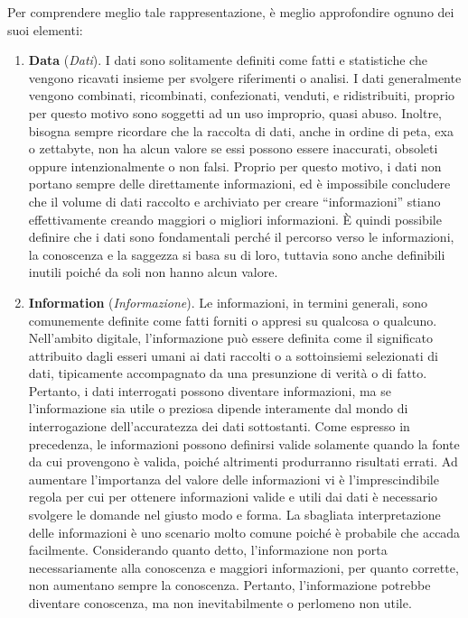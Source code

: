 Per comprendere meglio tale rappresentazione, è meglio approfondire ognuno dei suoi elementi:\cite{researchgate_revising_dikw_pyramid}
\begin{enumerate}
    \item \textbf{Data} (\textit{Dati}). I dati sono solitamente definiti come fatti e statistiche che vengono ricavati insieme per svolgere riferimenti o analisi. I dati generalmente vengono combinati, ricombinati, confezionati, venduti, e ridistribuiti, proprio per questo motivo sono soggetti ad un uso improprio, quasi abuso. Inoltre, bisogna sempre ricordare che la raccolta di dati, anche in ordine di peta, exa o zettabyte, non ha alcun valore se essi possono essere inaccurati, obsoleti oppure intenzionalmente o non falsi. Proprio per questo motivo, i dati non portano sempre delle direttamente informazioni, ed è impossibile concludere che il volume di dati raccolto e archiviato per creare “informazioni” stiano effettivamente creando maggiori o migliori informazioni. È quindi possibile definire che i dati sono fondamentali perché il percorso verso le informazioni, la conoscenza e la saggezza si basa su di loro, tuttavia sono anche definibili inutili poiché da soli non hanno alcun valore.
    \item \textbf{Information} (\textit{Informazione}). Le informazioni, in termini generali, sono comunemente definite come fatti forniti o appresi su qualcosa o qualcuno. Nell’ambito digitale, l’informazione può essere definita come il significato attribuito dagli esseri umani ai dati raccolti o a sottoinsiemi selezionati di dati, tipicamente accompagnato da una presunzione di verità o di fatto. Pertanto, i dati interrogati possono diventare informazioni, ma se l’informazione sia utile o preziosa dipende interamente dal mondo di interrogazione dell’accuratezza dei dati sottostanti. Come espresso in precedenza, le informazioni possono definirsi valide solamente quando la fonte da cui provengono è valida, poiché altrimenti produrranno risultati errati. Ad aumentare l’importanza del valore delle informazioni vi è l’imprescindibile regola per cui per ottenere informazioni valide e utili dai dati è necessario svolgere le domande nel giusto modo e forma. La sbagliata interpretazione delle informazioni è uno scenario molto comune poiché è probabile che accada facilmente. Considerando quanto detto, l’informazione non porta necessariamente alla conoscenza e maggiori informazioni, per quanto corrette, non aumentano sempre la conoscenza. Pertanto, l’informazione potrebbe diventare conoscenza, ma non inevitabilmente o perlomeno non utile.

\end{enumerate}
